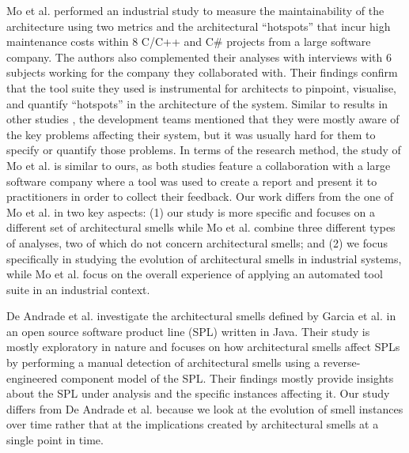 Mo et al. \cite{Mo2018} performed an industrial study to measure the maintainability of the architecture using two metrics and the architectural ``hotspots'' that incur high maintenance costs within 8 C/C++ and C\# projects from a large software company.
The authors also complemented their analyses with interviews with 6 subjects working for the company they collaborated with.
Their findings confirm that the tool suite they used is instrumental for architects to pinpoint, visualise, and quantify ``hotspots'' in the architecture of the system.
Similar to results in other studies \cite{Arcelli2020}, the development teams mentioned that they were mostly aware of the key problems affecting their system, but it was usually hard for them to specify or quantify those problems.
In terms of the research method, the study of Mo et al. is similar to ours, as both studies feature a collaboration with a large software company where a tool was used to create a report and present it to practitioners in order to collect their feedback.
Our work differs from the one of Mo et al. in two key aspects: (1) our study is more specific and focuses on a different set of architectural smells while Mo et al. combine three different types of analyses, two of which do not concern architectural smells; and (2) we focus specifically in studying the evolution of architectural smells in industrial systems, while Mo et al. focus on the overall experience of applying an automated tool suite in an industrial context.

De Andrade et al. \cite{DeAndrade2014} investigate the architectural smells defined by Garcia et al. \cite{Garcia2009} in an open source software product line (SPL) written in Java.
Their study is mostly exploratory in nature and focuses on how architectural smells affect SPLs by performing a manual detection of architectural smells using a reverse-engineered component model of the SPL.
Their findings mostly provide insights about the SPL under analysis and the specific instances affecting it.
Our study differs from De Andrade et al. because we look at the evolution of smell instances over time rather that at the implications created by architectural smells at a single point in time.

